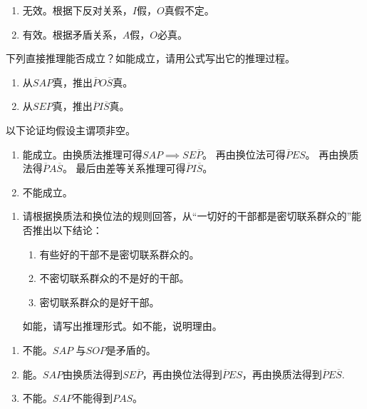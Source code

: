 \documentclass{ctexart}
\begin{document}
\begin{solution}
  \begin{enumerate}
    \item 无效。根据下反对关系，\(I\)假，\(O\)真假不定。
    \item 有效。根据矛盾关系，\(A\)假，\(O\)必真。
  \end{enumerate}
\end{solution}
\begin{problem}\label{pro:4}
  下列直接推理能否成立？如能成立，请用公式写出它的推理过程。
  \begin{enumerate}
    \item 从\(SAP\)真，推出\(\overline{P}O \overline{S}\)真。
    \item 从\(SEP\)真，推出\(\overline{P}I \overline{S}\)真。
  \end{enumerate}
\end{problem}
\begin{solution}
  以下论证均假设主谓项非空。
  \begin{enumerate}
    \item 能成立。由换质法推理可得\(SAP\implies SE \overline{P}\)。
      再由换位法可得\(\overline{P}E S\)。
      再由换质法得\(\overline{P} A \overline{S}\)。
      最后由差等关系推理可得\(\overline{P}I \overline{S}\)。
    \item 不能成立。
  \end{enumerate}
\end{solution}
\begin{problem}\label{pro:5}
  \begin{enumerate}
    \item 请根据换质法和换位法的规则回答，从``一切好的干部都是密切联系群众的''能否推出以下结论：
      \begin{enumerate}
        \item 有些好的干部不是密切联系群众的。
        \item 不密切联系群众的不是好的干部。
        \item 密切联系群众的是好干部。
      \end{enumerate}
      如能，请写出推理形式。如不能，说明理由。
  \end{enumerate}
\end{problem}
\begin{solution}
  \begin{enumerate}
    \item 不能。\(SAP\) 与\(SOP\)是矛盾的。
    \item 能。\(SAP\)由换质法得到\(SE \overline{P}\)，再由换位法得到\(\overline{P}ES\)，再由换质法得到\(\overline{P}E \overline{S}\).
    \item 不能。\(SAP\)不能得到\(PAS\)。
  \end{enumerate}
\end{solution}
\end{document}
